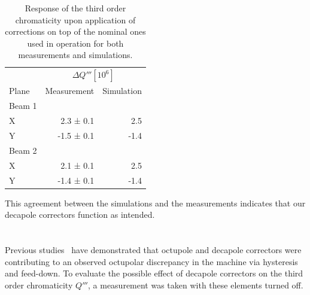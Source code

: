  
  \begin{table}[H]
    \centering
    \begin{tabular}{lrr}
      \toprule
           & \multicolumn{2}{c}{$\Delta Q''' [10^6]$}\\
       Plane         & Measurement   & Simulation \\
      \midrule
        Beam 1  &    & \\
        \hspace{2mm}X       &  2.3 ± 0.1 &   2.5 \\
        \hspace{2mm}Y       & -1.5 ± 0.1 &  -1.4 \\
        Beam 2  &            &  \\
        \hspace{2mm}X       & 2.1 ± 0.1  &  2.5\\
        \hspace{2mm}Y       & -1.4 ± 0.1 & -1.4\\
        \bottomrule
    \end{tabular}
    \caption{Response of the third order chromaticity upon application of corrections on top of the
    nominal ones used in operation for both measurements and simulations.}
    \label{table:decapoles:chromaticity:dq3_before_after_beam_based_response}
  \end{table}


This agreement between the simulations and the measurements indicates that our decapole correctors
function as intended.



\section{}



Previous studies~\cite{maclean_measurement_2014} have demonstrated that octupole and decapole
correctors were contributing to an observed octupolar discrepancy in the machine via hysteresis and
feed-down. To evaluate the possible effect of decapole correctors on the third order chromaticity
$Q'''$, a measurement was taken with these elements turned off.

